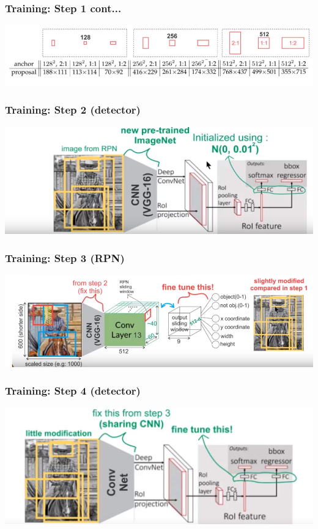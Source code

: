 \documentclass{beamer}
\begin{document}
    \begin{frame}
       \frametitle{Training: Step 1 cont...}
       \centering
         \includegraphics[width=1.0\textwidth]{images/anchors.PNG}
    \end{frame}
    
    \begin{frame}
       \frametitle{Training: Step 2 (detector)}
       \centering
         \includegraphics[width=1.0\textwidth]{images/step2.PNG}
    \end{frame}
    
    \begin{frame}
       \frametitle{Training: Step 3 (RPN)}
       \centering
         \includegraphics[width=1.0\textwidth]{images/step3.PNG}
    \end{frame}
    
        \begin{frame}
       \frametitle{Training: Step 4 (detector)}
       \centering
         \includegraphics[width=1.0\textwidth]{images/step4.PNG}
    \end{frame}
    
\end{document}
